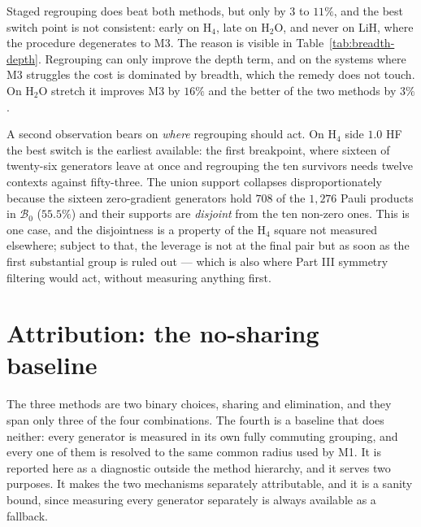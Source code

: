 \documentclass[10pt]{article}
\begin{document}
Staged regrouping does beat both methods, but only by $3$ to $11\%$, and the best switch point is not consistent: early on H$_4$, late on H$_2$O, and never on LiH, where the procedure degenerates to M3. The reason is visible in Table~\ref{tab:breadth-depth}. Regrouping can only improve the depth term, and on the systems where M3 struggles the cost is dominated by breadth, which the remedy does not touch. On H$_2$O stretch it improves M3 by $16\%$ and the better of the two methods by $3\%$.

A second observation bears on \emph{where} regrouping should act. On H$_4$ side $1.0$ HF the best switch is the earliest available: the first breakpoint, where sixteen of twenty-six generators leave at once and regrouping the ten survivors needs twelve contexts against fifty-three. The union support collapses disproportionately because the sixteen zero-gradient generators hold $708$ of the $1{,}276$ Pauli products in $\mathcal B_0$ ($55.5\%$) and their supports are \emph{disjoint} from the ten non-zero ones. This is one case, and the disjointness is a property of the H$_4$ square not measured elsewhere; subject to that, the leverage is not at the final pair but as soon as the first substantial group is ruled out --- which is also where Part III symmetry filtering would act, without measuring anything first.

\section{Attribution: the no-sharing baseline}
\label{sec:baseline}

The three methods are two binary choices, sharing and elimination, and they span
only three of the four combinations. The fourth is a baseline that does neither:
every generator is measured in its own fully commuting grouping, and every one of
them is resolved to the same common radius used by M1. It is reported here as a
diagnostic outside the method hierarchy, and it serves two purposes. It makes the
two mechanisms separately attributable, and it is a sanity bound, since measuring
every generator separately is always available as a fallback.
\end{document}
